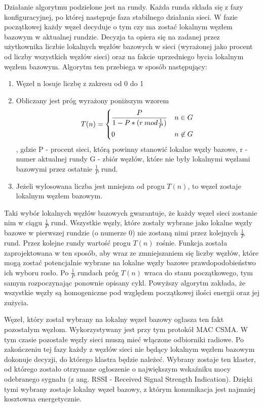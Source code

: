 Działanie algorytmu podzielone jest na rundy. Każda runda składa się z fazy konfiguracyjnej, po której następuje faza stabilnego działania sieci. W fazie początkowej każdy węzeł decyduje o tym czy ma zostać lokalnym węzłem bazowym w aktualnej rundzie. Decyzja ta opiera się na zadanej przez użytkownika liczbie lokalnych węzłów bazowych w sieci (wyrażonej jako procent od liczby wszystkich węzłów sieci) oraz na fakcie uprzedniego bycia lokalnym węzłem bazowym.
Algorytm ten przebiega w sposób następujący:
\begin{enumerate}
	\item Węzeł n losuje liczbę z zakresu od 0 do 1
	\item Obliczany jest próg wyrażony poniższym wzorem
	\[T(n) = \begin{dcases} 
      \frac{P}{1-P*(r\:mod\frac{1}{P})} & n \in G \\
      0 & n \not\in G \\
   \end{dcases}
	\]
	, gdzie P - procent sieci, którą powinny stanowić lokalne węzły bazowe,
	r - numer aktualnej rundy
	G - zbiór węzłów, które nie były lokalnymi węzłami bazowymi przez ostatnie $\frac{1}{P}$ rund.
	\item Jeżeli wylosowana liczba jest mniejsza od progu $T(n)$, to węzeł zostaje lokalnym węzłem bazowym.
\end{enumerate}
Taki wybór lokalnych węzłów bazowych gwarantuje, że każdy węzeł sieci zostanie nim w ciągu $\frac{1}{P}$ rund. Wszystkie węzły, które zostały wybrane jako lokalne węzły bazowe w pierwszej rundzie (o numerze 0) nie zostaną nimi przez kolejnych $\frac{1}{P}$ rund. Przez kolejne rundy wartość progu $T(n)$ rośnie. Funkcja została zaprojektowana w ten sposób, aby wraz ze zmniejszaniem się liczby węzłów, które mogą zostać potencjalnie wybrane na lokalne węzły bazowe prawdopodobieństwo ich wyboru rosło. Po $\frac{1}{P}$ rundach próg $T(n)$ wraca do stanu początkowego, tym samym rozpoczynając ponownie opisany cykl.
Powyższy algorytm zakłada, że wszystkie węzły są homogeniczne pod względem początkowej ilości energii oraz jej zużycia.

Węzeł, który został wybrany na lokalny węzeł bazowy ogłasza ten fakt  pozostałym węzłom. Wykorzystywany jest przy tym protokół MAC CSMA. W tym czasie pozostałe węzły sieci muszą mieć włączone odbiorniki radiowe. Po zakończeniu tej fazy każdy z węzłów sieci nie będący lokalnym węzłem bazowym dokonuje decyzji, do którego klastra będzie należeć. Wybrany zostaje ten klaster, od którego zostało otrzymane ogłoszenie o największym wskaźniku mocy odebranego sygnału (z ang. RSSI - Received Signal Strength Indication). Dzięki tymi wybrany zostaje lokalny węzeł bazowy, z którym komunikacja jest najmniej kosztowna energetycznie.


